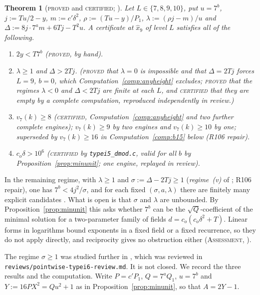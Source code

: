 \documentclass[11pt,reqno]{amsart}
\newtheorem{theorem}{Theorem}[section]
\theoremstyle{definition}
\newcommand{\status}[1]{\textup{\textsc{#1}}}
\begin{document}
\begin{theorem}[\status{proved} and \status{certified}; {\cite[Prop.~3.3, Lemma~3.6, Thm.~3.7]{PT5}}]\label{thm:L710}
Let $L\in\{7,8,9,10\}$, put $u=7^b$, $j:=Tu/2-y$, $m:=c'\delta^2$,
$\rho:=(Tu-y)/P_1$, $\lambda:=(\rho j-m)/u$ and
$\Delta:=8j\cdot7^am+6Tj-T^2u$.  A certificate at $\hat x_9$ of level $L$
satisfies all of the following.
\begin{enumerate}
\item[(a)] $2y<T7^b$ (\status{proved}, by hand).
\item[(b)] $\lambda\ge1$ and $\Delta>2Tj$.  (\status{proved} that
$\lambda=0$ is impossible and that $\Delta=2Tj$ forces $L=9$, $b=0$,
which Computation~\ref{comp:anyheight} excludes;
\status{proved} that the regimes $\lambda<0$ and $\Delta<2Tj$ are finite
at each $L$, and \status{certified} that they are empty by a complete
computation, reproduced independently in review.)
\item[(c)] $v_7(k)\ge8$ (\status{certified},
Computation~\ref{comp:anyheight} and two further complete engines);
$v_7(k)\ge9$ by two engines and $v_7(k)\ge10$ by one; superseded by
$v_7(k)\ge16$ in Computation~\ref{comp:b15} below (R106 repair).
\item[(d)] $c_o\delta>10^6$ (\status{certified} by
\texttt{typei5\_dmod.c}, valid for all $b$ by
Proposition~\ref{prop:minunit}; one engine, replayed in review).
\end{enumerate}
\end{theorem}

In the remaining regime, with $\lambda\ge1$ and $\sigma:=\Delta-2Tj\ge1$
(\emph{regime~(v)} of \cite[Prop.~3.3]{PT5}; R106 repair), one has
$7^b<4j^2/\sigma$, and for each fixed $(\sigma,a,\lambda)$ there are
finitely many explicit candidates \cite[Prop.~3.3(v)]{PT5}.  What is open
is that $\sigma$ and $\lambda$ are unbounded.  By
Proposition~\ref{prop:minunit} this asks whether $7^b$ can be the
$\sqrt Q$-coefficient of the minimal solution for a two-parameter family
of fields $d=c_o(c_o\delta^2+T)$.  Linear forms in logarithms bound
exponents in a fixed field or a fixed recurrence, so they do not apply
directly, and reciprocity gives no obstruction either (\status{Assessment},
\cite[\S3]{PT5}).

The regime $\sigma\ge1$ was studied further in \cite{PT6}, which was
reviewed in \texttt{reviews/pointwise-typei6-review.md}.  It is not closed.  We
record the three results and the computation.  Write
$P=c'P_1$, $Q=7^aQ_1$, $u=7^b$ and $Y:=16PX^2=Qu^2+1$ as in
Proposition~\ref{prop:minunit}, so that $A=2Y-1$.
\end{document}
